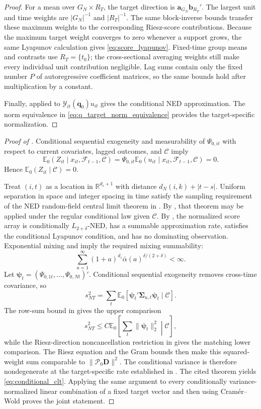 \documentclass[11pt]{article}
\numberwithin{equation}{section}
\theoremstyle{remark}
\newcommand{\R}{\mathbb R}
\newcommand{\Ezero}{\mathbb E_0}
\newcommand{\bq}{\bm q}
\newcommand{\bD}{\bm D}
\newcommand{\calP}{\mathcal P}
\begin{document}
\begin{proof}
For a mean over $G_N\times R_T$, the target direction is $\bm a_{G_N}\bm b_{R_T}'$. The largest unit and time weights are $|G_N|^{-1}$ and $|R_T|^{-1}$. The same block-inverse bounds transfer these maximum weights to the corresponding Riesz-score contributions. Because the maximum target weight converges to zero whenever a support grows, the same Lyapunov calculation gives \eqref{eq:score_lyapunov}. Fixed-time group means and contrasts use $R_T=\{t_0\}$; the cross-sectional averaging weights still make every individual unit contribution negligible. Lag sums contain only the fixed number $P$ of autoregressive coefficient matrices, so the same bounds hold after multiplication by a constant.

Finally,  applied to $\mathcal Y_{it}(\bq_0)u_{it}$ gives the conditional NED approximation. The norm equivalence in \eqref{eq:q_target_norm_equivalence} provides the target-specific normalization.
\end{proof}

\begin{proof}[Proof of ]
Conditional sequential exogeneity and measurability of $\Psi_{0,it}$ with respect to current covariates, lagged outcomes, and $\mathscr C$ imply
$$
\Ezero(Z_{it}\mid x_{it},\mathscr F_{t-1},\mathscr C)
=
\Psi_{0,it}
\Ezero(u_{it}\mid x_{it},\mathscr F_{t-1},\mathscr C)
=
0.
$$
Hence $\Ezero(Z_{it}\mid\mathscr C)=0$.

Treat $(i,t)$ as a location in $\R^{d_s+1}$ with distance $d_N(i,k)+|t-s|$. Uniform separation in space and integer spacing in time satisfy the sampling requirement of the NED random-field central limit theorem in \citet{jenishprucha2012}. By , that theorem may be applied under the regular conditional law given $\mathscr C$. By , the normalized score array is conditionally $L_{2+\delta}$-NED, has a summable approximation rate, satisfies the conditional Lyapunov condition, and has no dominating observation. Exponential mixing and  imply the required mixing summability:
$$
\sum_{a=1}^{\infty}
(1+a)^{d_s}
\bar\alpha(a)^{\delta/(2+\delta)}
<
\infty.
$$
Let $\bm\psi_t=(\Psi_{0,1t},\ldots,\Psi_{0,Nt})'$. Conditional sequential exogeneity removes cross-time covariance, so
$$
s_{NT}^2
=
\sum_t
\Ezero[
\bm\psi_t'\bm\Sigma_{u,t}\bm\psi_t
\mid\mathscr C].
$$
The row-sum bound in  gives the upper comparison
$$
s_{NT}^2
\le
C\Ezero\!\left[
\sum_t\|\bm\psi_t\|_2^2
\middle|\mathscr C
\right],
$$
while the Riesz-direction noncancellation restriction in  gives the matching lower comparison. The Riesz equation and the Gram bounds then make this squared-weight sum comparable to $\|\calP_0\bD\|^2$. The conditional variance is therefore nondegenerate at the target-specific rate established in . The cited theorem yields \eqref{eq:conditional_clt}. Applying the same argument to every conditionally variance-normalized linear combination of a fixed target vector and then using Cram\'er--Wold proves the joint statement.
\end{proof}
\end{document}
